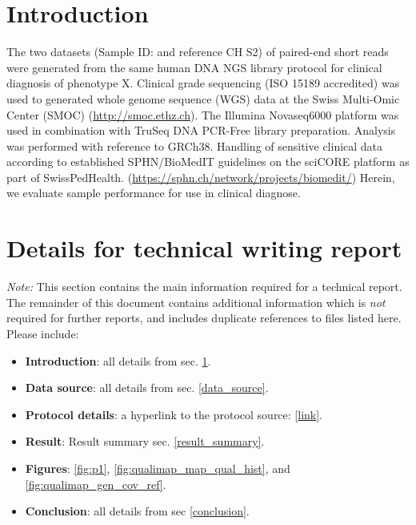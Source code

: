 \documentclass{article}
\begin{document}
\begin{figure}[h] \hspace*{0cm} 
\begin{center}

\end{center}
\end{figure}

\section{Introduction}
\label{intro}
The two datasets (Sample ID: {\color{kispired}\SampleID} and reference CH S2) of paired-end short reads were generated from the same human DNA NGS library protocol for clinical diagnosis of phenotype X. 
Clinical grade sequencing (ISO 15189 accredited) was used 
to generated whole genome sequence (WGS) data
at the Swiss Multi-Omic Center (SMOC) 
(\url{http://smoc.ethz.ch}).
The Illumina Novaseq6000 platform was used in combination with 
TruSeq DNA PCR-Free library preparation.
Analysis was performed with reference to GRCh38. 
Handling of sensitive clinical data according to established SPHN/BioMedIT guidelines on the sciCORE platform as part of  SwissPedHealth.
(\url{https://sphn.ch/network/projects/biomedit/})
Herein, we evaluate sample performance for use in clinical diagnose.



\section{Details for technical writing report}
\textit{Note:}
This section contains the main information required for a technical report.
The remainder of this document contains additional information which is \textit{not} required for further reports, and includes duplicate references to files listed here.
Please include:

\begin{itemize}
\item \textbf{Introduction}: all details from sec. \ref{intro}.
\item \textbf{Data source}: all details from sec. \ref{data_source}.
\item \textbf{Protocol details}: a hyperlink to the protocol source: [\href{https://github.com/DylanLawless/kit_assess/README.md}{link}].
\item \textbf{Result}: Result summary sec. \ref{result_summary}.
\item \textbf{Figures}: \ref{fig:p1}, \ref{fig:qualimap_map_qual_hist},  and \ref{fig:qualimap_gen_cov_ref}.
\item \textbf{Conclusion}: all details from sec \ref{conclusion}.
\end{itemize}
\end{document}
